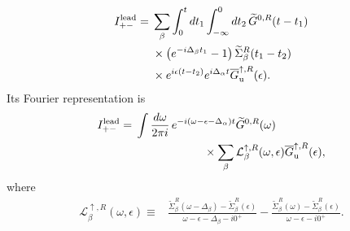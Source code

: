 \documentclass[
 reprint,
 superscriptaddress,
 amsmath,amssymb,
 aps,prb,
 longbibliography,
 floatfix
]{revtex4-2}
\begin{document}
\begin{align*}
I_{+-}^{\rm lead}
={}&
\sum_\beta
\int_0^t dt_1
\int_{-\infty}^{0}dt_2\,
\widetilde G^{0,R}(t-t_1)
\\
&\times
\left(e^{-i\Delta_\beta t_1}-1\right)
\widetilde\Sigma_\beta^R(t_1-t_2)
\\
&\times
e^{i\epsilon(t-t_2)}
e^{i\Delta_\alpha t}
\overline G_{\mathrm u}^{\uparrow,R}(\epsilon).
\end{align*}
Its Fourier representation is
\begin{equation*}
\begin{aligned}
I_{+-}^{\rm lead}
={}&
\int\frac{d\omega}{2\pi i}\,
e^{-i(\omega-\epsilon-\Delta_\alpha)t}
\widetilde G^{0,R}(\omega)
\\
&\qquad\qquad\qquad\times
\sum_\beta
\mathcal L_\beta^{\uparrow,R}(\omega,\epsilon)
\overline G_{\mathrm u}^{\uparrow,R}(\epsilon),
\end{aligned}
\end{equation*}
where
\begin{equation*}
\begin{aligned}
\mathcal L_\beta^{\uparrow,R}(\omega,\epsilon)
\equiv{}&
\frac{
\widetilde\Sigma_\beta^R(\omega-\Delta_\beta)
-
\widetilde\Sigma_\beta^R(\epsilon)}
{\omega-\epsilon-\Delta_\beta-i0^+}
-
\frac{
\widetilde\Sigma_\beta^R(\omega)
-
\widetilde\Sigma_\beta^R(\epsilon)}
{\omega-\epsilon-i0^+}.
\end{aligned}
\end{equation*}
\end{document}
